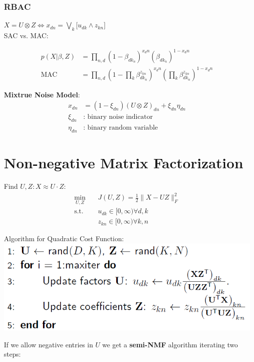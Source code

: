 \documentclass[a4paper,landscape,10pt]{article}
\begin{document}
\begin{multicols}{4}
\subsubsection{RBAC} 
$X = U \otimes Z \Leftrightarrow x_{dn} = \bigvee_k \big[
u_{dk} \wedge z_{kn} \big]$ \\
    SAC vs. MAC:
    
\begin{align*}
    p(X | \beta, Z) &= 
    \prod_{n,d} (1 - \beta_{dk_n})^{x_dn}(\beta_{dk_n})^{1 - x_dn} \\
    \text{MAC} &= 
    \prod_{n,d} (1 - \prod_{k} \beta_{dk_n}^{z_{kn}})^{x_dn}
    (\prod_{k} \beta_{dk_n}^{z_{kn}})^{1 - x_dn}
\end{align*}

{\bf Mixtrue Noise Model}:
\begin{align*}
    x_{dn} &= (1 - \xi_{dn}) (U \otimes Z)_{dn} + \xi_{dn}\eta_{dn} \\
    \xi_{dn} &\text{: binary noise indicator} \\
    \eta_{dn} &\text{: binary random variable}
\end{align*}

\section{Non-negative Matrix Factorization}
Find $U, Z: X \approx U \cdot Z$:
\begin{align*}
\min_{U,Z} \quad &J(U, Z) = \frac{1}{2} \| X - UZ \|_F^2 \\
\text{s.t.}\quad &u_{dk} \in [0, \infty) \forall d, k    \\
                 &z_{kn} \in [0, \infty) \forall k, n
\end{align*}

Algorithm for Quadratic Cost Function:
\includegraphics[width=0.9\linewidth]{nmf-quadratic}

If we allow negative entries in $U$ we get a {\bf semi-NMF} algorithm
iterating two steps:


\end{multicols}
\end{document}
